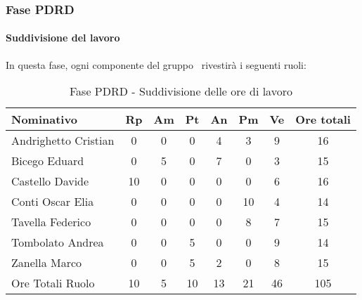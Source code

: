 \documentclass[../PianoProgetto.tex]{subfiles}
\begin{document}
	\subsubsection{Fase PDRD}
				\paragraph{Suddivisione del lavoro}
					In questa fase, ogni componente del gruppo \leaf\ rivestirà i seguenti ruoli:
	
					\begin{table}[h]
		\centering
	
		\begin{tabular}{l * {7}{c}}
			\toprule
			Nominativo & Rp & Am & Pt & An & Pm & Ve & Ore totali \\
			\midrule
			Andrighetto Cristian & 0 & 0 & 0 & 4 & 3 & 9 & 16 \\
			\midrule
			Bicego Eduard & 0 & 5 &	0 &	7 &	0 &	3 &	15 \\
			\midrule
			Castello Davide & 10 & 0 & 0 & 0 & 0 & 6 & 16 \\
			\midrule
			Conti Oscar Elia & 0 & 0 & 0 & 0 & 10 &	4 &	14 \\
			\midrule
			Tavella Federico &	0 & 0 &	0 &	0 &	8 &	7 &	15 \\
			\midrule
			Tombolato Andrea & 0 & 0 & 5 & 0 & 0 & 9 & 14 \\
			\midrule
			Zanella Marco & 0 & 0 & 5 &	2 &	0 &	8 &	15 \\
			\midrule			
			Ore Totali Ruolo & 10 & 5 & 10 & 13 &	21 & 46 & 105 \\
			\bottomrule
			
		\end{tabular}
		
		\caption{Fase PDRD - Suddivisione delle ore di lavoro}
		\label{tab:fasePDRD_ore}
		
	\end{table}
	
\end{document}
